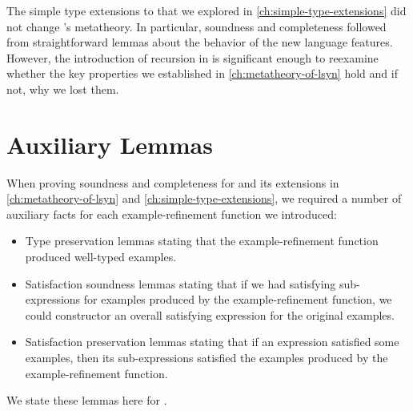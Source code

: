 The simple type extensions to \lsyn{} that we explored in \autoref{ch:simple-type-extensions} did not change \lsyn{}'s metatheory.
In particular, soundness and completeness followed from straightforward lemmas about the behavior of the new language features.
However, the introduction of recursion in \mlsyn{} is significant enough to reexamine whether the key properties we established in \autoref{ch:metatheory-of-lsyn} hold and if not, why we lost them.

\section{Auxiliary Lemmas}

When proving soundness and completeness for \lsyn{} and its extensions in \autoref{ch:metatheory-of-lsyn} and \autoref{ch:simple-type-extensions}, we required a number of auxiliary facts for each example-refinement function we introduced:
\begin{itemize}
  \item Type preservation lemmas stating that the example-refinement function produced well-typed examples.
  \item Satisfaction soundness lemmas stating that if we had satisfying sub-expressions for examples produced by the example-refinement function, we could constructor an overall satisfying expression for the original examples.
  \item Satisfaction preservation lemmas stating that if an expression satisfied some examples, then its sub-expressions satisfied the examples produced by the example-refinement function.
\end{itemize}
We state these lemmas here for \mlsyn{}.

